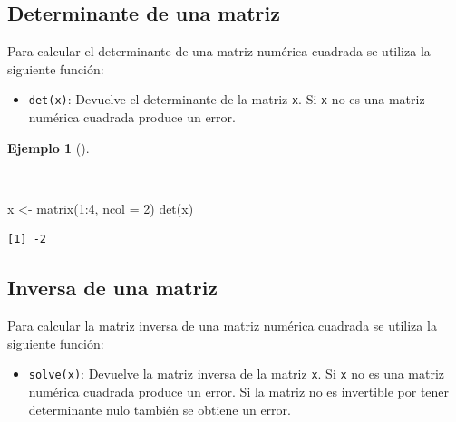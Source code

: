 \documentclass[
  a4paper,
]{scrreport}
\newenvironment{Shaded}{\begin{snugshade}}{\end{snugshade}}
\newcommand{\AttributeTok}[1]{\textcolor[rgb]{0.40,0.45,0.13}{#1}}
\newcommand{\DecValTok}[1]{\textcolor[rgb]{0.68,0.00,0.00}{#1}}
\newcommand{\FunctionTok}[1]{\textcolor[rgb]{0.28,0.35,0.67}{#1}}
\newcommand{\NormalTok}[1]{\textcolor[rgb]{0.00,0.23,0.31}{#1}}
\newcommand{\OtherTok}[1]{\textcolor[rgb]{0.00,0.23,0.31}{#1}}
\newcommand{\SpecialCharTok}[1]{\textcolor[rgb]{0.37,0.37,0.37}{#1}}
\providecommand{\tightlist}{%
  \setlength{\itemsep}{0pt}\setlength{\parskip}{0pt}}\usepackage{longtable,booktabs,array}
\theoremstyle{definition}
\theoremstyle{definition}
\newtheorem{example}{Ejemplo}[chapter]
\theoremstyle{remark}
\begin{document}
\hypertarget{determinante-de-una-matriz}{%
\subsection{Determinante de una
matriz}\label{determinante-de-una-matriz}}

Para calcular el determinante de una matriz numérica cuadrada se utiliza
la siguiente función:

\begin{itemize}
\tightlist
\item
  \texttt{det(x)}: Devuelve el determinante de la matriz \texttt{x}. Si
  \texttt{x} no es una matriz numérica cuadrada produce un error.
\end{itemize}

\begin{example}[]\protect\hypertarget{exm-determinante}{}\label{exm-determinante}

~

\begin{Shaded}
\begin{Highlighting}[]
\NormalTok{x }\OtherTok{\textless{}{-}} \FunctionTok{matrix}\NormalTok{(}\DecValTok{1}\SpecialCharTok{:}\DecValTok{4}\NormalTok{, }\AttributeTok{ncol =} \DecValTok{2}\NormalTok{)}
\FunctionTok{det}\NormalTok{(x)}
\end{Highlighting}
\end{Shaded}

\begin{verbatim}
[1] -2
\end{verbatim}

\end{example}

\hypertarget{inversa-de-una-matriz}{%
\subsection{Inversa de una matriz}\label{inversa-de-una-matriz}}

Para calcular la matriz inversa de una matriz numérica cuadrada se
utiliza la siguiente función:

\begin{itemize}
\tightlist
\item
  \texttt{solve(x)}: Devuelve la matriz inversa de la matriz \texttt{x}.
  Si \texttt{x} no es una matriz numérica cuadrada produce un error. Si
  la matriz no es invertible por tener determinante nulo también se
  obtiene un error.
\end{itemize}
\end{document}
